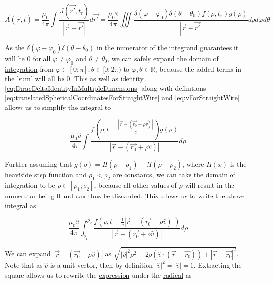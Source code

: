 ﻿\documentclass{article}
\begin{document}
\begin{equation*}
    \vec{A}(\vec{r}, t) = \frac{\mu_0}{4 \pi} \int \frac{\vec{J}(\vec{r'}, t_r)}{|\vec{r} - \vec{r'}|} d \vec{r'} = \frac{\mu_0 \hat{v}}{4 \pi} \iiint \frac{\delta(\varphi - \varphi_0) \delta(\theta - \theta_0) f(\rho, t_r) g(\rho)}{|\vec{r} - \vec{r'}|} d \rho d \varphi d \theta
\end{equation*}

As the $\delta(\varphi - \varphi_0) \delta(\theta - \theta_0)$ in the \href{https://en.wikipedia.org/wiki/Fraction}{numerator} of the \href{https://en.wikipedia.org/wiki/Integral#Terminology_and_notation}{integrand} guarantees it will be $0$ for all $\varphi \neq \varphi_0$ and $\theta \neq \theta_0$, we can safely expand the \href{https://en.wikipedia.org/wiki/Integral}{domain of integration} from $\varphi \in [0; \pi]; \theta \in [0; 2 \pi)$ to $\varphi, \theta \in \mathbb{R}$, because the added terms in the 'sum' will all be $0$. This as well as identity \ref{eq:DiracDeltaIdentityInMultipleDimensions} along with definitions \ref{eq:translatedSphericalCoordinatesForStraightWire} and \ref{eq:vForStraightWire} allows us to simplify the integral to

\begin{equation*}
    \frac{\mu_0 \hat{v}}{4 \pi} \int \frac{f \left( \rho, t - \frac{|\vec{r} - (\vec{r_0} + \rho \hat{v})|}{c} \right) g(\rho)}{|\vec{r} - (\vec{r_0} + \rho \hat{v})|} d \rho
\end{equation*}

Further assuming that $g(\rho) = H(\rho - \rho_1) - H(\rho - \rho_2)$, where $H(x)$ is the \href{https://en.wikipedia.org/wiki/Heaviside_step_function}{heaviside step function} and $\rho_1 < \rho_2$ are \href{https://en.wikipedia.org/wiki/Constant_(mathematics)}{constants}, we can take the domain of integration to be $\rho \in [\rho_1; \rho_2]$, because all other values of $\rho$ will result in the numerator being $0$ and can thus be discarded. This allows us to write the above integral as

\begin{equation*}
    \frac{\mu_0 \hat{v}}{4 \pi} \int_{\rho_1}^{\rho_2} \frac{f(\rho, t - \frac{1}{c} |\vec{r} - (\vec{r_0} + \rho \hat{v})|)}{|\vec{r} - (\vec{r_0} + \rho \hat{v})|} d \rho
\end{equation*}

We can expand $|\vec{r} - (\vec{r_0} + \rho \hat{v})|$ as $\sqrt{|\hat{v}|^2 \rho^2 - 2 \rho (\hat{v} \cdot (\vec{r} - \vec{r_0})) + |\vec{r} - \vec{r_0}|^2}$. Note that as $\hat{v}$ is a unit vector, then by definition $|\hat{v}|^2 = |\hat{v}| = 1$. Extracting the square allows us to rewrite the \href{https://en.wikipedia.org/wiki/Expression_(mathematics)}{expression} under the \href{https://en.wikipedia.org/wiki/Radical_symbol}{radical} as
\end{document}
